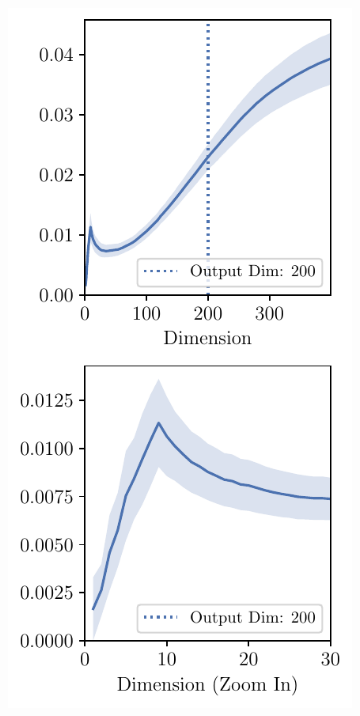 \begin{figure}[h]
    \centering
    \begin{subfigure}[b]{0.23\textwidth}
        \centering
        \captionsetup{justification=centering}
        \includegraphics[width=\textwidth]{Appendix_Figures/Overlap_large_model/FailCases/early/FC2_fixlr0.01_fc2_zoom_stacked.pdf}

\end{subfigure}
\end{figure}
